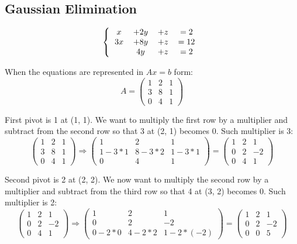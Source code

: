 \documentclass[12pt]{article}
\begin{document}
\subsection{Gaussian Elimination}

\[ 
\left \{
  \begin{tabular}{cccc}
  $x$ & $+2y$ & $+z$ & $=2$\\
  $3x$ & $+8y$ & $+z$ & $=12$\\
  & $4y$ & $+z$ & $=2$\\
  \end{tabular}
\right
.\]

When the equations are represented in $Ax=b$ form:
\[
A=
\left(
    \begin{matrix}
        1 & 2 & 1\\ 
        3 & 8 & 1\\
        0 & 4 & 1
    \end{matrix}
\right)
\]

First pivot is 1 at (1, 1). We want to multiply the first row by a multiplier and subtract from the second row so that 3 at (2, 1) becomes 0. Such multiplier is 3:
\[
\left(
    \begin{matrix}
        \boxed{1} & 2 & 1\\ 
        3 & 8 & 1\\
        0 & 4 & 1
    \end{matrix}
\right)
\Rightarrow
\left(
    \begin{matrix}
        \boxed{1} & 2 & 1\\ 
        1-3*1 & 8-3*2 & 1-3*1\\
        0 & 4 & 1
    \end{matrix}
\right)
=
\left(
    \begin{matrix}
        \boxed{1} & 2 & 1\\ 
        0 & 2 & -2\\
        0 & 4 & 1
    \end{matrix}
\right)
\]

Second pivot is 2 at (2, 2). We now want to multiply the second row by a multiplier and subtract from the third row so that 4 at (3, 2) becomes 0. Such multiplier is 2:
\[
\left(
    \begin{matrix}
        1 & 2 & 1\\ 
        0 & \boxed{2} & -2\\
        0 & 4 & 1
    \end{matrix}
\right)
\Rightarrow
\left(
    \begin{matrix}
        1 & 2 & 1\\ 
        0 & \boxed{2} & -2\\
        0-2*0 & 4-2*2 & 1-2*(-2)
    \end{matrix}
\right)
=
\left(
    \begin{matrix}
        1 & 2 & 1\\ 
        0 & \boxed{2} & -2\\
        0 & 0 & 5
    \end{matrix}
\right)
\]
\end{document}
